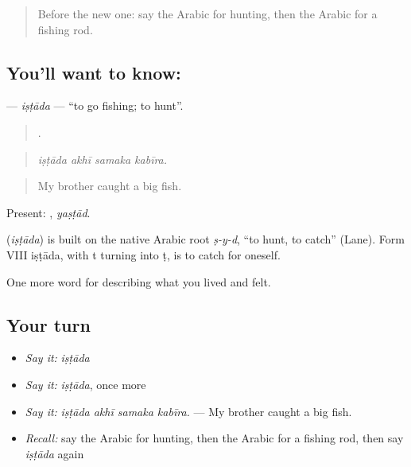 \begin{quote}
Before the new one: say the Arabic for hunting, then the Arabic for a fishing rod.
\end{quote}

\subsection*{You'll want to know: }
\textbf{} — \emph{iṣṭāda} — \textquotedblleft{}to go fishing; to hunt\textquotedblright{}.

\begin{quote}
   .
\end{quote}

\begin{quote}
\emph{iṣṭāda akhī samaka kabīra.}
\end{quote}

\begin{quote}
My brother caught a big fish.
\end{quote}

Present: , \emph{yaṣṭād}.

\begin{cousinweb}
\textbf{} (\emph{iṣṭāda}) is built on the native Arabic root \emph{ṣ-y-d}, \textquotedblleft{}to hunt, to catch\textquotedblright{} (Lane). Form VIII iṣṭāda, with t turning into ṭ, is to catch for oneself.
\end{cousinweb}

\begin{grammarlens}[title={What you've built}]
One more word for describing what you lived and felt.
\end{grammarlens}

\subsection*{Your turn}
\begin{itemize}
\raggedright
  \item \emph{Say it:} \emph{iṣṭāda}
  \item \emph{Say it:} \emph{iṣṭāda}, once more
  \item \emph{Say it:} \emph{iṣṭāda akhī samaka kabīra.} — My brother caught a big fish.
  \item \emph{Recall:} say the Arabic for hunting, then the Arabic for a fishing rod, then say \emph{iṣṭāda} again
\end{itemize}

